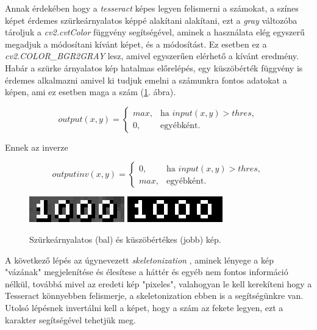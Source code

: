 Annak érdekében hogy a \textit{tesseract} képes legyen felismerni a számokat, a színes képet érdemes szürkeárnyalatos képpé alakítani alakítani, ezt a \textit{gray} változóba tároljuk a \textit{cv2.cvtColor} függvény segítségével, aminek a használata elég egyszerű
megadjuk a módosítani kívánt képet, és a módosítást. Ez esetben ez a \textit{cv2.COLOR\_BGR2GRAY} lesz, amivel egyszerűen elérhető a kívánt eredmény.
Habár a szürke árnyalatos kép hatalmas előrelépés, egy küszöbérték függvény is érdemes alkalmazni amivel ki tudjuk emelni a számunkra fontos adatokat a képen, ami ez esetben maga a szám (\ref{fig:orig}. ábra).


\begin{equation*}
    output(x, y) = \left\{ 
    \begin{matrix}
        max, & \text{ha } input(x, y) > thres, \\
        0, & \text{egyébként}.
    \end{matrix} \right.
\end{equation*}

Ennek az inverze

\begin{equation*}
    outputinv(x, y) = \left\{ 
    \begin{matrix}
        0, & \text{ha } input(x ,y) > thres, \\
        max, & \text{egyébként}.
    \end{matrix} \right.
\end{equation*}

\begin{figure}[h]
    \centering
    \includegraphics[scale=1]{images/grey.png}
    \includegraphics[scale=1]{images/thres.png}
    \caption{Szürkeárnyalatos (bal) és küszöbértékes (jobb) kép.}
    \label{fig:orig}
\end{figure}

A következő lépés az úgynevezett \textit{skeletonization} {\cite{skeletonization}}, aminek lényege a kép "vázának" megjelenítése és élesítese a háttér és egyéb nem fontos információ nélkül, továbbá mivel az eredeti kép "pixeles", valahogyan le kell kerekíteni hogy a Tesseract könnyebben felismerje, a skeletonization ebben is a segítségünkre van. Utolsó lépésnek invertálni kell a képet, hogy a szám az fekete legyen, ezt a \textit{~} karakter segítségével tehetjük meg.

